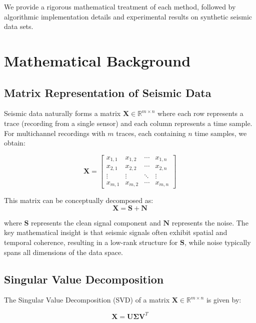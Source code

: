 \documentclass[11pt]{article}
\begin{document}
We provide a rigorous mathematical treatment of each method, followed by algorithmic implementation details and experimental results on synthetic seismic data sets.

\section{Mathematical Background}
\subsection{Matrix Representation of Seismic Data}

Seismic data naturally forms a matrix $\mathbf{X} \in \mathbb{R}^{m \times n}$ where each row represents a trace (recording from a single sensor) and each column represents a time sample. For multichannel recordings with $m$ traces, each containing $n$ time samples, we obtain:

\begin{equation}
\mathbf{X} = 
\begin{bmatrix}
x_{1,1} & x_{1,2} & \cdots & x_{1,n} \\
x_{2,1} & x_{2,2} & \cdots & x_{2,n} \\
\vdots & \vdots & \ddots & \vdots \\
x_{m,1} & x_{m,2} & \cdots & x_{m,n}
\end{bmatrix}
\end{equation}

This matrix can be conceptually decomposed as:
\begin{equation}
\mathbf{X} = \mathbf{S} + \mathbf{N}
\end{equation}

where $\mathbf{S}$ represents the clean signal component and $\mathbf{N}$ represents the noise. The key mathematical insight is that seismic signals often exhibit spatial and temporal coherence, resulting in a low-rank structure for $\mathbf{S}$, while noise typically spans all dimensions of the data space.

\subsection{Singular Value Decomposition}
The Singular Value Decomposition (SVD) of a matrix $\mathbf{X} \in \mathbb{R}^{m \times n}$ is given by:

\begin{equation}
\mathbf{X} = \mathbf{U} \mathbf{\Sigma} \mathbf{V}^T
\end{equation}
\end{document}
